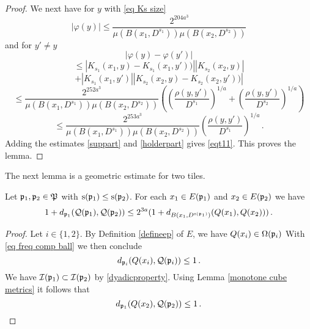 {\begin{proof}
We next have for $y$ with \eqref{eq Ks size}
\begin{equation}\label{suppart}
    |\varphi(y)|\le
    \frac{2^{204 a^3}}{\mu(B(x_1, D^{s_1}))\mu(B(x_2, D^{s_2}))}
\end{equation}
and for $y'\neq y$
\begin{equation}
    |\varphi(y)-\varphi(y')|
 \end{equation}
 \begin{equation}
 \le
 |K_{s_1}(x_1,y)-K_{s_1}(x_1,y'))||
 K_{s_2}(x_2, y)|
\end{equation}
 \begin{equation}+|K_{s_1}(x_1, y')|
 |K_{s_2}(x_2, y) - K_{s_2}(x_2, y'))|
\end{equation}
\begin{equation}
      \le \frac{2^{252 a^3}}{\mu(B(x_1, D^{s_1}))\mu(B(x_2, D^{s_2}))}
       \left(\left(\frac{ \rho(y,y')}{D^{s_1}}\right)^{1/a}+
       \left(\frac{ \rho(y,y')}{D^{s_2}}\right)^{1/a}\right)
\end{equation}
\begin{equation}\label{holderpart}
      \le \frac{2^{253 a^3}}{\mu(B(x_1, D^{s_1}))\mu(B(x_2, D^{s_2}))}
       \left(\frac{ \rho(y,y')}{D^{s_1}}\right)^{1/a}\,.
\end{equation}
Adding the estimates \eqref{suppart} and \eqref{holderpart} gives \eqref{eqt11}.
This proves the lemma.
\end{proof}
The next lemma is a geometric estimate for two tiles.
\begin{lemma}\label{lem tgeo}
    Let $\mathfrak p_1, \mathfrak p_2\in \mathfrak P$ with
$\mathrm{s}({\mathfrak p_1})\leq \mathrm{s}({\mathfrak p_2})$. For each $x_1\in E(\mathfrak p_1)$ and
$x_2\in E(\mathfrak p_2)$  we have
\begin{equation}\label{tgeo}
  1+d_{\mathfrak p_1}(\mathcal{Q}(\mathfrak p_1), \mathcal{Q}(\mathfrak p_2))\le
    2^{3a}(1 + d_{B(x_1, D^{\mathrm{s}(\mathfrak p_1)})}({Q}(x_1),{Q}(x_2)))\, .
\end{equation}
\end{lemma}
\begin{proof}
Let $i\in \{1,2\}$.
By Definition \eqref{defineep} of $E$,
we have ${Q}(x_i)\in \Omega(\mathfrak p_i)$
With \eqref{eq freq comp ball} we then conclude
\begin{equation}\label{dponetwo}
    d_{\mathfrak p_i}({Q}(x_i),\mathcal{Q}(\mathfrak p_i))\le 1\, .
\end{equation}
We have $\mathcal{I}(\mathfrak p_1)\subset \mathcal{I}(\mathfrak p_2)$ by \eqref{dyadicproperty}. Using Lemma \ref{monotone cube metrics} it follows that
\begin{equation}\label{tgeo0.5}
    d_{\fp_1}(\tQ(x_2), \fcc(\fp_2)) \le 1\,.

\end{equation}
\end{proof}}
